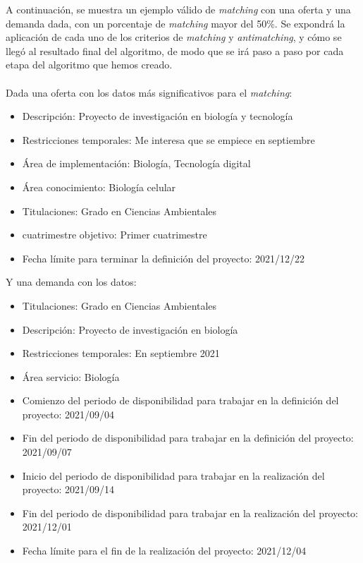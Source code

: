 \documentclass[11pt]{book}
\begin{document}
	A continuación, se muestra un ejemplo válido de \emph{matching} con una oferta y una demanda dada, con un porcentaje de \emph{matching} mayor del 50\%. Se expondrá la aplicación de cada uno de los criterios de \emph{matching} y \emph{antimatching}, y cómo se llegó al resultado final del algoritmo, de modo que se irá paso a paso por cada etapa del algoritmo que hemos creado.\\\\
	Dada una oferta con los datos más significativos para el \emph{matching}:\\
	\begin{itemize} 
		\item Descripción: Proyecto de investigación en biología y tecnología
		\item Restricciones temporales: Me interesa que se empiece en septiembre
		\item Área de implementación: Biología, Tecnología digital
		\item Área conocimiento: Biología celular
		\item Titulaciones: Grado en Ciencias Ambientales
		\item cuatrimestre objetivo: Primer cuatrimestre
		\item Fecha límite para terminar la definición del proyecto: 2021/12/22
		\\
	\end{itemize}
	Y una demanda con los datos:\\
	\begin{itemize} 
		\item Titulaciones: Grado en Ciencias Ambientales
		\item Descripción: Proyecto de investigación en biología
		\item Restricciones temporales: En septiembre 2021
		\item Área servicio: Biología
		\item Comienzo del periodo de disponibilidad para trabajar en la definición del
		proyecto: 2021/09/04
		\item Fin del periodo de disponibilidad para trabajar en la definición del
		proyecto: 2021/09/07
		\item Inicio del periodo de disponibilidad para trabajar en la realización del
		proyecto: 2021/09/14
		\item Fin del periodo de disponibilidad para trabajar en la realización del
		proyecto: 2021/12/01
		\item Fecha límite para el fin de la realización del proyecto: 2021/12/04
	\end{itemize}
\end{document}
